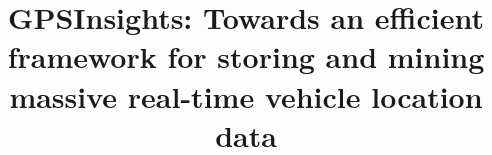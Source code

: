 \documentclass{acm_proc_article-sp}
\begin{document}
\title{GPSInsights: Towards an efficient framework for storing and mining massive real-time vehicle location data}


%
%
%
%
%
\end{document}

